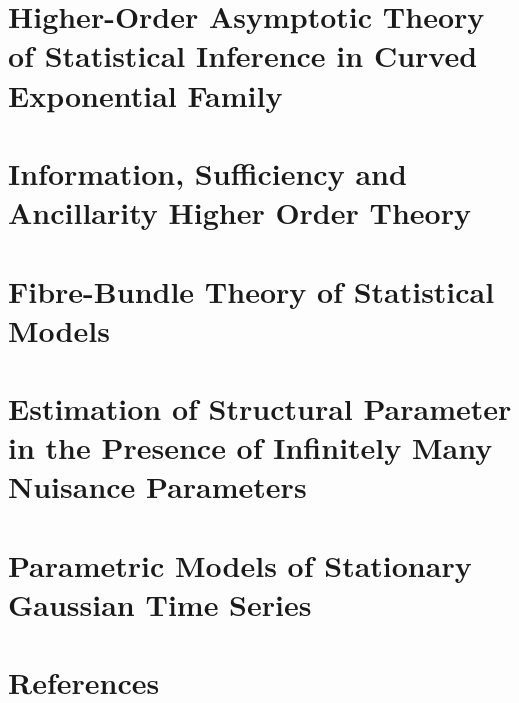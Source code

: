 \documentclass[11pt]{article}
\begin{document}
\section{Higher-Order Asymptotic Theory of Statistical Inference in Curved Exponential Family}

\section{Information, Sufficiency and Ancillarity Higher Order Theory}

\section{Fibre-Bundle Theory of Statistical Models}

\section{Estimation of Structural Parameter in the Presence of Infinitely Many Nuisance Parameters}

\section{Parametric Models of Stationary Gaussian Time Series}

\section{References}
\end{document}
